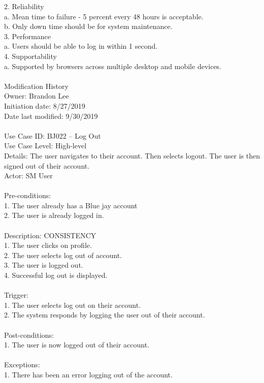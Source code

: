 \documentclass{report}
\begin{document}
2. Reliability\\
a.	Mean time to failure - 5 percent every 48 hours is acceptable.\\
b.	Only down time should be for system maintenance.\\
3. Performance\\
a.	Users should be able to log in within 1 second.\\
4. Supportability\\
a.	Supported by browsers across multiple desktop and mobile devices.\\
\\
Modification History\\
     Owner: Brandon Lee\\
     Initiation date: 8/27/2019\\
     Date last modified: 9/30/2019\\
\\
Use Case ID: BJ022 – Log Out\\
Use Case Level: High-level\\
Details:  The user navigates to their account. Then selects logout. The user is then signed out of their account.\\
Actor: SM User\\
\\
Pre-conditions: \\
1.	The user already has a Blue jay account\\
2.	The user is already logged in.\\
\\
Description: CONSISTENCY\\
1.	The user clicks on profile.\\
2.	The user selects log out of account.\\
3.	The user is logged out.\\
4.	Successful log out is displayed.\\
\\
Trigger: \\
1.	The user selects log out on their account.\\
2.	The system responds by logging the user out of their account.\\
\\
Post-conditions: \\
1.	The user is now logged out of their account.\\
\\
Exceptions: \\
1.	There has been an error logging out of the account.\\
\end{document}
